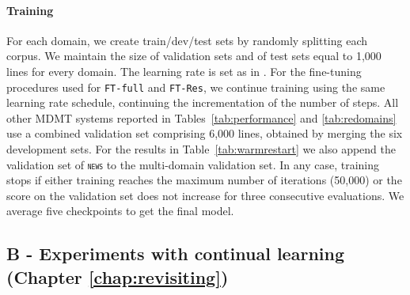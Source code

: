 \documentclass[12pt,a4paper,twoside]{report}
\theoremstyle{definition}
\newcommand{\domain}[1]{\texttt{\textsc{#1}}}
\newcommand{\system}[1]{\texttt{{#1}}}
\begin{document}
\paragraph{Training} For each domain, we create train/dev/test sets by randomly splitting each corpus. We maintain the size of validation sets and of test sets equal to 1,000 lines for every domain.
The learning rate is set
as in \cite{Vaswani17attention}. For the fine-tuning procedures used for \system{FT-full} and \system{FT-Res}, we continue training using the same learning rate schedule, continuing the incrementation of the number of steps. All other MDMT systems reported in Tables~\ref{tab:performance} and \ref{tab:redomains} use a combined validation set comprising 6,000 lines, obtained by merging the six development sets. For the results in Table~\ref{tab:warmrestart} we also append the validation set of \domain{news} to the multi-domain validation set. In any case, training stops if either training reaches the maximum number of iterations (50,000) or the score on the validation set does not increase for three consecutive evaluations. We average five checkpoints to get the final model.

\subsection*{B - Experiments with continual learning \label{ssec:full-continual}(Chapter \ref{chap:revisiting})}
\end{document}
